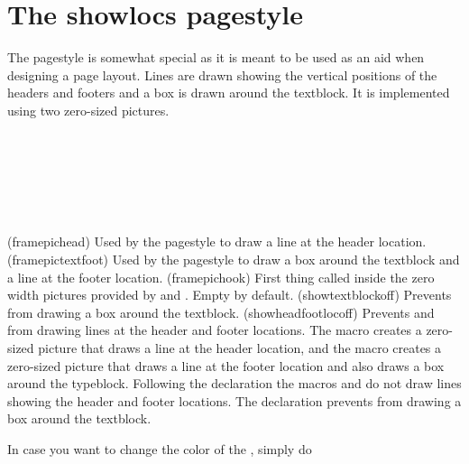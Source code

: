 
\section{The showlocs pagestyle}

    The  pagestyle is somewhat special as it is meant to be
used as an aid when designing a page layout. Lines are drawn showing the 
vertical positions of the headers and footers and a box is drawn around
the textblock. It is implemented using two 
zero-sized pictures.
\begin{syntax}
\cmd{\framepichead} \\
\cmd{\framepictextfoot} \\
\cmd{\framepichook} \\
\cmd{\showheadfootlocoff} \\
\cmd{\showtextblockoff} \\
\end{syntax}
\glossary(framepichead)%
  {}%
  {Used by the  pagestyle to draw a line at the header 
   location.}
\glossary(framepictextfoot)%
  {}%
  {Used by the  pagestyle to draw a box around the textblock
   and a line at the footer location.}
\glossary(framepichook)%
  {}%
  {First thing called inside the zero width pictures provided by
     and . Empty by default.}%
\glossary(showtextblockoff)%
  {}%
  {Prevents  from drawing a box around the textblock.}
\glossary(showheadfootlocoff)%
  {}%
  {Prevents  and  from drawing
   lines at the header and footer locations.}
%
The macro \cmd{\framepichead} creates a zero-sized 
picture that draws a line at the header location, and the macro 
\cmd{\framepictextfoot} creates a zero-sized 
picture that draws a line at the footer location
and also draws a box around the typeblock. Following the declaration
\cmd{\showheadfootlocoff} the macros \cmd{\framepichead} and 
\cmd{\framepictextfoot} do not draw lines showing the header and footer
locations. The declaration \cmd{\showtextblockoff} prevents
\cmd{\framepictextfoot} from drawing a box around the textblock.

In case you want to change the color of the , simply do
\begin{lcode}
  \renewcommand\framepichook{\color{red}}
\end{lcode}



